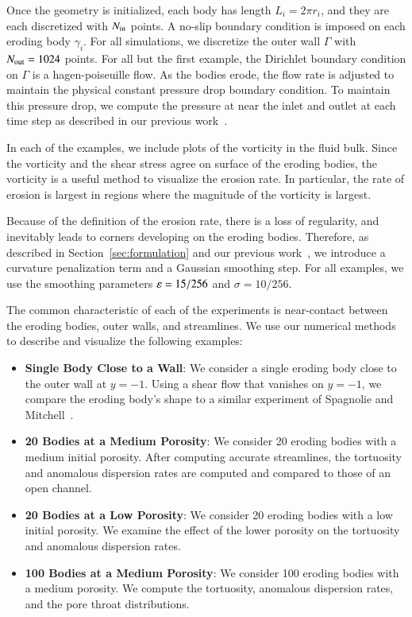 \documentclass[preprint,10pt]{elsarticle}
\begin{document}
Once the geometry is initialized, each body has length $L_i = 2\pi r_i$,
and they are each discretized with $N_{\mathrm{in}}$ points.  A no-slip boundary
condition is imposed on each eroding body $\gamma_i$.  For all
simulations, we discretize the outer wall $\Gamma$ with $N_{\mathrm{out}}=1024$
points.  For all but the first example, the Dirichlet boundary condition
on $\Gamma$ is a hagen-poiseuille flow.  As the bodies erode, the flow
rate is adjusted to maintain the physical constant pressure drop
boundary condition.  To maintain this pressure drop, we compute the
pressure at near the inlet and outlet at each time step as described in
our previous work~\cite{qua-moo2018}.

In each of the examples, we include plots of the vorticity in the fluid
bulk.  Since the vorticity and the shear stress agree on surface of the
eroding bodies, the vorticity is a useful method to visualize the
erosion rate.  In particular, the rate of erosion is largest in regions
where the magnitude of the vorticity is largest.

Because of the definition of the erosion rate, there is a loss of
regularity, and inevitably leads to corners developing on the
eroding bodies.  Therefore, as described in
Section~\ref{sec:formulation} and our previous work~\cite{qua-moo2018},
we introduce a curvature penalization term and a Gaussian smoothing
step.  For all examples, we use the smoothing parameters $\varepsilon=15/256$
and $\sigma=10/256$.

The common characteristic of each of the experiments is near-contact
between the eroding bodies, outer walls, and streamlines. We use our
numerical methods to describe and visualize the following examples:
\begin{itemize}
  \item{\bf Single Body Close to a Wall}: We consider a single eroding
  body close to the outer wall at $y=-1$.  Using a shear flow that
  vanishes on $y=-1$, we compare the eroding body's shape to a similar
  experiment of Spagnolie and Mitchell~\cite{mit-spa2017}.

  \item{\bf 20 Bodies at a Medium Porosity}: We consider 20 eroding
  bodies with a medium initial porosity.  After computing accurate
  streamlines, the tortuosity and anomalous dispersion rates are
  computed and compared to those of an open channel.

  \item{\bf 20 Bodies at a Low Porosity}: We consider 20 eroding bodies
  with a low initial porosity.  We examine the effect of the lower
  porosity on the tortuosity and anomalous dispersion rates.

  \item{\bf 100 Bodies at a Medium Porosity}: We consider 100 eroding
  bodies with a medium porosity.  We compute the tortuosity, anomalous
  dispersion rates, and the pore throat distributions.
\end{itemize}
\end{document}
